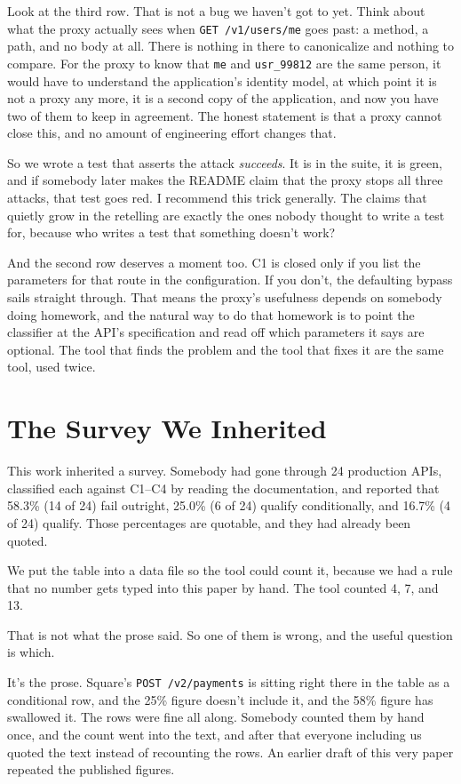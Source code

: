\documentclass[11pt]{article}
\begin{document}
Look at the third row. That is not a bug we haven't got to yet. Think about
what the proxy actually sees when \texttt{GET /v1/users/me} goes past: a
method, a path, and no body at all. There is nothing in there to canonicalize
and nothing to compare. For the proxy to know that \texttt{me} and
\texttt{usr\_99812} are the same person, it would have to understand the
application's identity model, at which point it is not a proxy any more, it is
a second copy of the application, and now you have two of them to keep in
agreement. The honest statement is that a proxy cannot close this, and no
amount of engineering effort changes that.

So we wrote a test that asserts the attack \emph{succeeds}. It is in the suite,
it is green, and if somebody later makes the README claim that the proxy stops
all three attacks, that test goes red. I recommend this trick generally. The
claims that quietly grow in the retelling are exactly the ones nobody thought
to write a test for, because who writes a test that something doesn't work?

And the second row deserves a moment too. C1 is closed only if you list the
parameters for that route in the configuration. If you don't, the defaulting
bypass sails straight through. That means the proxy's usefulness depends on
somebody doing homework, and the natural way to do that homework is to point
the classifier at the API's specification and read off which parameters it
says are optional. The tool that finds the problem and the tool that fixes it
are the same tool, used twice.

\section{The Survey We Inherited}
\label{sec:survey}

This work inherited a survey. Somebody had gone through 24 production APIs,
classified each against C1--C4 by reading the documentation, and reported that
58.3\% (14 of 24) fail outright, 25.0\% (6 of 24) qualify conditionally, and
16.7\% (4 of 24) qualify. Those percentages are quotable, and they had already
been quoted.

We put the table into a data file so the tool could count it, because we had
a rule that no number gets typed into this paper by hand. The tool counted 4,
7, and 13.

That is not what the prose said. So one of them is wrong, and the useful
question is which.

It's the prose. Square's \texttt{POST /v2/payments} is sitting right there in
the table as a conditional row, and the 25\% figure doesn't include it, and the
58\% figure has swallowed it. The rows were fine all along. Somebody counted
them by hand once, and the count went into the text, and after that everyone
including us quoted the text instead of recounting the rows. An earlier draft
of this very paper repeated the published figures.
\end{document}
